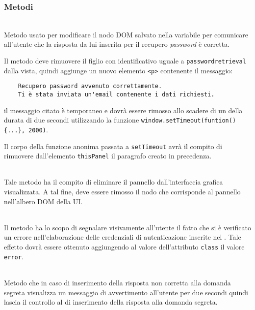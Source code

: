 \subsubsection*{Metodi}
\begin{description}

  \item{}\\
	Metodo usato per modificare il nodo DOM salvato nella variabile  per comunicare all'utente che la risposta da lui inserita per il recupero \textit{password} è corretta. 
	
Il metodo deve rimuovere il figlio con identificativo uguale a \texttt{passwordretrieval} dalla vista, quindi aggiunge un nuovo elemento \verb'<p>' contenente il messaggio:
\begin{verbatim}
	Recupero password avvenuto correttamente.
	Ti è stata inviata un'email contenente i dati richiesti.
\end{verbatim}
il messaggio citato è temporaneo e dovrà essere rimosso allo scadere di un  della durata di due secondi utilizzando la funzione \verb'window.setTimeout(funtion() {...}, 2000)'.

Il corpo della funzione anonima passata a \verb'setTimeout' avrà il compito di rimuovere dall'elemento \verb'thisPanel' il paragrafo creato in precedenza.

  \item{}\\
  Tale metodo ha il compito di eliminare il pannello dall'interfaccia grafica visualizzata. A tal fine, deve essere rimosso il nodo che corrisponde al pannello nell'albero DOM della UI\@.
  
  \item{}\\
  Il metodo ha lo scopo di segnalare visivamente all'utente il fatto che si è verificato un errore nell'elaborazione delle credenziali di autenticazione inserite nel . Tale effetto dovrà essere ottenuto aggiungendo al valore dell'attributo \verb+class+ il valore \verb+error+.

	\item{}\\
	Metodo che in caso di inserimento della risposta non corretta alla domanda segreta visualizza un messaggio di avvertimento all'utente per due secondi quindi lascia il controllo al  di inserimento della risposta alla domanda segreta.
	

\end{description}
